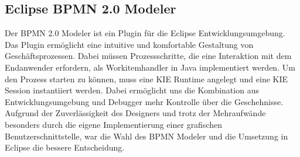 \subsection{Eclipse BPMN 2.0 Modeler}
Der BPMN 2.0 Modeler ist ein Plugin für die Eclipse Entwicklungsumgebung. Das Plugin ermöglicht eine intuitive und komfortable Gestaltung von Geschäftsprozessen. Dabei müssen Prozessschritte, die eine Interaktion mit dem Endanwender erfordern, als Workitemhandler in Java implementiert werden. Um den Prozess starten zu können, muss eine KIE Runtime angelegt und eine KIE Session instantiiert werden. Dabei ermöglicht uns die Kombination aus Entwicklungsumgebung und Debugger mehr Kontrolle über die Geschehnisse. Aufgrund der Zuverlässigkeit des Designers und trotz der Mehraufwände besonders durch die eigene Implementierung einer grafischen Benutzerschnittstelle, war die Wahl des BPMN Modeler und die Umsetzung in Eclipse die bessere Entscheidung. 